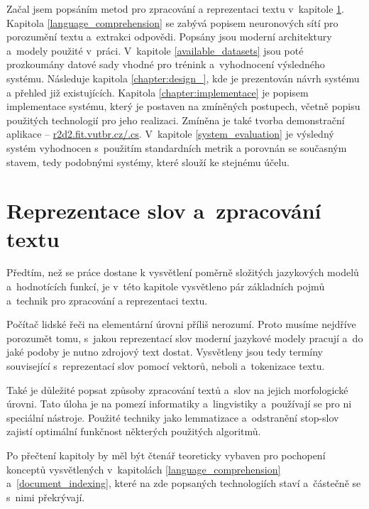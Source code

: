 Začal jsem popsáním metod pro zpracování a reprezentaci textu v~kapitole \ref{text_processing}. Kapitola \ref{language_comprehension} se zabývá popisem neuronových sítí pro porozumění textu a~extrakci odpovědi. Popsány jsou moderní architektury a~modely použité v~práci. V~kapitole \ref{available_datasets} jsou poté prozkoumány datové sady vhodné pro trénink a~vyhodnocení výsledného systému. Následuje kapitola \ref{chapter:design_}, kde je prezentován návrh systému a přehled již existujících. Kapitola \ref{chapter:implementace} je popisem implementace systému, který je postaven na zmíněných postupech, včetně popisu použitých technologií pro jeho realizaci. Zmíněna je také tvorba demonstrační aplikace -- \href{http://r2d2.fit.vutbr.cz/.cs}{r2d2.fit.vutbr.cz/.cs}. V~kapitole \ref{system_evaluation} je výsledný systém vyhodnocen s~použitím standardních metrik a porovnán se současným stavem, tedy podobnými systémy, které slouží ke stejnému účelu.


\chapter{Reprezentace slov a~zpracování textu}
\label{text_processing}

Předtím, než se práce dostane k vysvětlení poměrně složitých jazykových modelů a~hodnotících funkcí, je v~této kapitole vysvětleno pár základních pojmů a~technik pro zpracování a reprezentaci textu.\par 
Počítač lidské řeči na elementární úrovni příliš nerozumí. Proto musíme nejdříve porozumět tomu, s~jakou reprezentací slov moderní jazykové modely pracují a~do jaké podoby je nutno zdrojový text dostat. Vysvětleny jsou tedy termíny související s~reprezentací slov pomocí vektorů, neboli  a~tokenizace textu.\par 
Také je důležité popsat způsoby zpracování textů a~slov na jejich morfologické úrovni. Tato úloha je na pomezí informatiky a~lingvistiky a~používají se pro ni speciální nástroje. Použité techniky jako lemmatizace a~odstranění stop-slov zajistí optimální funkčnost některých použitých algoritmů.\par
Po přečtení kapitoly by měl být čtenář teoreticky vybaven pro pochopení konceptů vysvětlených v~kapitolách \ref{language_comprehension} a~\ref{document_indexing}, které na zde popsaných technologiích staví a~částečně se s~nimi překrývají.

